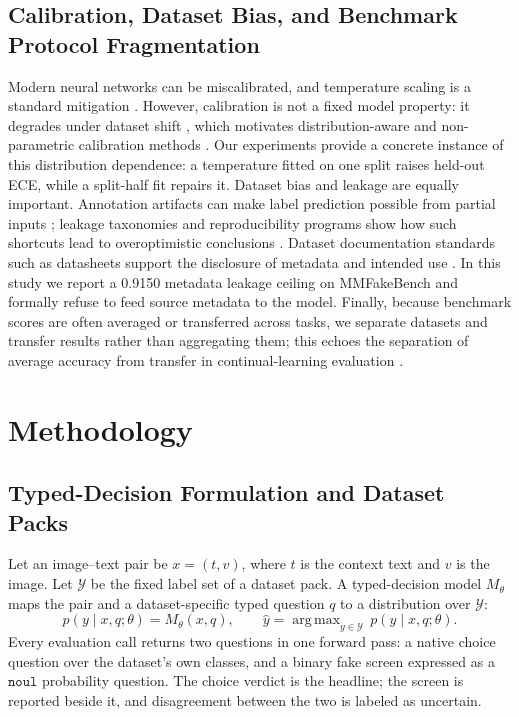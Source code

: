 \documentclass{article} %
\begin{document}
\subsection{Calibration, Dataset Bias, and Benchmark Protocol Fragmentation}
Modern neural networks can be miscalibrated, and temperature scaling is a standard mitigation \citep{Guo2017CalibrationModern, Naeini2015ObtainingWell}. However, calibration is not a fixed model property: it degrades under dataset shift \citep{Ovadia2019CanYou, Minderer2021RevisitingCalibration}, which motivates distribution-aware and non-parametric calibration methods \citep{Kull2019BeyondTemperature, Kumar2019VerifiedUncertainty, Vaicenavicius2019EvaluatingModel, Gupta2020CalibrationNeural, Nixon2019MeasuringCalibration, Barber2019ConformalPrediction, Gibbs2021AdaptiveConformal}. Our experiments provide a concrete instance of this distribution dependence: a temperature fitted on one split raises held-out ECE, while a split-half fit repairs it. Dataset bias and leakage are equally important. Annotation artifacts can make label prediction possible from partial inputs \citep{Gururangan2018AnnotationArtifacts}; leakage taxonomies and reproducibility programs show how such shortcuts lead to overoptimistic conclusions \citep{Kapoor2023LeakageReproducibility, Pineau2020ImprovingReproducibility, Kapoor2024ReformsConsensusbased}. Dataset documentation standards such as datasheets support the disclosure of metadata and intended use \citep{Gebru2018DatasheetsDatasets}. In this study we report a 0.9150 metadata leakage ceiling on MMFakeBench and formally refuse to feed source metadata to the model. Finally, because benchmark scores are often averaged or transferred across tasks, we separate datasets and transfer results rather than aggregating them; this echoes the separation of average accuracy from transfer in continual-learning evaluation \citep{Lopezpaz2017GradientEpisodic}.

\section{Methodology}
\label{sec:method}
\subsection{Typed-Decision Formulation and Dataset Packs}
Let an image--text pair be \(x=(t,v)\), where \(t\) is the context text and \(v\) is the image. Let \(\mathcal{Y}\) be the fixed label set of a dataset pack. A typed-decision model \(M_\theta\) maps the pair and a dataset-specific typed question \(q\) to a distribution over \(\mathcal{Y}\):
\[
p(y\mid x,q;\theta)=M_\theta(x,q),
\qquad
\hat{y}=\mathop{\mathrm{arg\,max}}_{y\in\mathcal{Y}}\,p(y\mid x,q;\theta).
\]
Every evaluation call returns two questions in one forward pass: a native choice question over the dataset's own classes, and a binary fake screen expressed as a \( \texttt{noul} \) probability question. The choice verdict is the headline; the screen is reported beside it, and disagreement between the two is labeled as uncertain.
\end{document}
